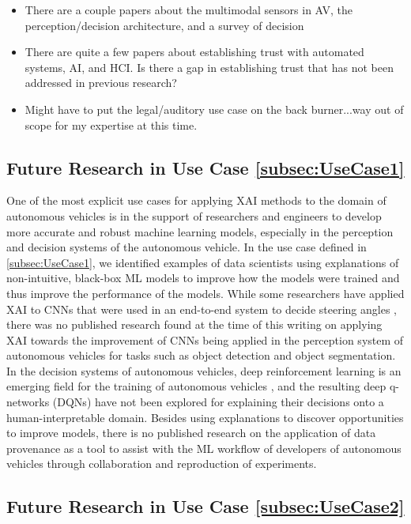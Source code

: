 \begin{itemize}
    \item There are a couple papers about the multimodal sensors in AV, the perception/decision architecture, and a survey of decision 
    \item There are quite a few papers about establishing trust with automated systems, AI, and HCI.  Is there a gap in establishing trust that has not been addressed in previous research?
    \item Might have to put the legal/auditory use case on the back burner...way out of scope for my expertise at this time.
\end{itemize}

\subsection{Future Research in Use Case \ref{subsec:UseCase1}}

One of the most explicit use cases for applying XAI methods to the domain of autonomous vehicles is in the support of researchers and engineers to develop more accurate and robust machine learning models, especially in the perception and decision systems of the autonomous vehicle.  In the use case defined in \ref{subsec:UseCase1}, we identified examples of data scientists using explanations of non-intuitive, black-box ML models to improve how the models were trained and thus improve the performance of the models.  While some researchers have applied XAI to CNNs that were used in an end-to-end system to decide steering angles \cite{Bojarski2017ExplainingHA}, there was no published research found at the time of this writing on applying XAI towards the improvement of CNNs being applied in the perception system of autonomous vehicles for tasks such as object detection and object segmentation.  In the decision systems of autonomous vehicles, deep reinforcement learning is an emerging field for the training of autonomous vehicles \cite{Sallab2017DeepRL}, and the resulting deep q-networks (DQNs) have not been explored for explaining their decisions onto a human-interpretable domain.  Besides using explanations to discover opportunities to improve models, there is no published research on the application of data provenance as a tool to assist with the ML workflow of developers of autonomous vehicles through collaboration and reproduction of experiments.

\subsection{Future Research in Use Case \ref{subsec:UseCase2}}

